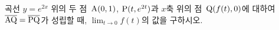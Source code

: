 곡선 $y=e^{2x}$ 위의 두 점~$\mathrm{A}(0{,}\mkern3mu\mathopen{}1)$, $\mathrm{P}(t{,}\mkern3mu\mathopen{}e^{2t})$과 $x$축 위의 점~$\mathrm{Q}(f(t){,}\mkern3mu\mathopen{}0)$에 대하여 $\overline{\mathrm{AQ}}=\overline{\mathrm{PQ}}$가 성립할 때, $\displaystyle\lim_{t\to 0}f(t)$의 값을 구하시오.
